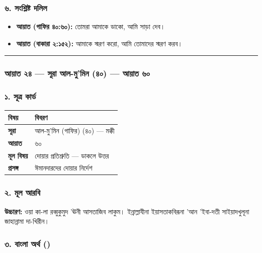 \subsubsection*{৬. সংশ্লিষ্ট দলিল}

\begin{itemize}
\item \textbf{আয়াত (গাফির ৪০:৬০):} তোমরা আমাকে ডাকো, আমি সাড়া দেব।
\item \textbf{আয়াত (বাকারা ২:১৫২):} আমাকে স্মরণ করো, আমি তোমাদের স্মরণ করব।
\end{itemize}
\medskip\hrule\medskip

\subsubsection*{আয়াত ২৪ — সূরা আল-মু'মিন (৪০) — আয়াত ৬০}

\subsubsection*{১. সূত্র কার্ড}

\begin{table}[h]\centering\small
\begin{tabular}{ll}
বিষয় & বিবরণ \\
\hline
\textbf{সূরা} & আল-মু'মিন (গাফির) (৪০) — মক্কী \\
\textbf{আয়াত} & ৬০ \\
\textbf{মূল বিষয়} & দোয়ার প্রতিশ্রুতি — ডাকলে উত্তর \\
\textbf{প্রসঙ্গ} & ঈমানদারদের দোয়ার নির্দেশ \\
\hline
\end{tabular}
\end{table}

\subsubsection*{২. মূল আরবি}

\begin{center}\end{center}
\textbf{উচ্চারণ:} ওয়া কা-লা রব্বুকুমুদ 'ঊনী আসতাজিব লাকুম। ইন্নাল্লাযীনা ইয়াসতাকবিরূনা 'আন 'ইবা-দতী সাইয়াদখুলূনা জাহান্নামা দা-খিরীন।

\subsubsection*{৩. বাংলা অর্থ ()}

